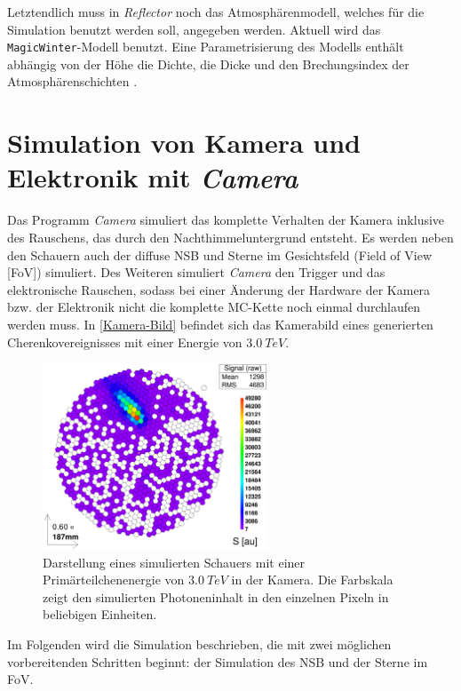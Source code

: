 Letztendlich muss in \textit{Reflector} noch das Atmosphärenmodell, welches für die Simulation benutzt werden soll, angegeben werden. 
Aktuell wird das \texttt{MagicWinter}-Modell benutzt. 
Eine Parametrisierung des Modells enthält abhängig von der Höhe die Dichte, die Dicke und den Brechungsindex der Atmosphärenschichten \cite{Haffke}.


\section{Simulation von Kamera und Elektronik mit \textit{Camera}}
\label{sec:Camera}
Das Programm \textit{Camera}\cite{Camera} simuliert das komplette Verhalten der Kamera inklusive des Rauschens, das durch den Nachthimmeluntergrund entsteht.
Es werden neben den Schauern auch der diffuse NSB und Sterne im Gesichtsfeld (Field of View [FoV]) simuliert. 
Des Weiteren simuliert \textit{Camera} den Trigger und das elektronische Rauschen, sodass bei einer Änderung der Hardware der Kamera bzw. der Elektronik nicht die komplette MC-Kette noch einmal durchlaufen werden muss.
In \autoref{Kamera-Bild} befindet sich das Kamerabild eines generierten Cherenkovereignisses mit einer Energie von $\SI{3.0}{TeV}$.

\begin{figure}
    \centering
    \includegraphics[width=0.6\textwidth]{./Plots/03_MonteCarlos/Signal_Job481_RunNr1513276_511_e3.0TeV_Zd32.2_fertig.png}
    \caption{Darstellung eines simulierten Schauers mit einer Primärteilchenenergie von $\SI{3.0}{TeV}$ in der Kamera. 
    Die Farbskala zeigt den simulierten Photoneninhalt in den einzelnen Pixeln in beliebigen Einheiten.}
    \label{Kamera-Bild}
\end{figure}

Im Folgenden wird die Simulation beschrieben, die mit zwei möglichen vorbereitenden Schritten beginnt: der Simulation des NSB und der Sterne im FoV.

